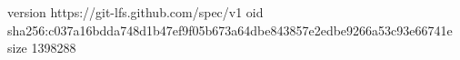version https://git-lfs.github.com/spec/v1
oid sha256:c037a16bdda748d1b47ef9f05b673a64dbe843857e2edbe9266a53c93e66741e
size 1398288
